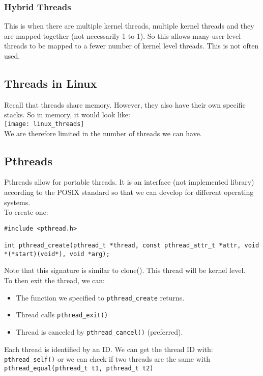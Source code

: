 \documentclass[12pt]{article}
\theoremstyle{definition}
\begin{document}
\subsubsection{Hybrid Threads}
This is when there are multiple kernel threads, multiple kernel threads and they are mapped together (not necessarily 1 to 1). So this allows many user level threads to be mapped to a fewer number of kernel level threads. This is not often used.

\subsection{Threads in Linux}
Recall that threads share memory. However, they also have their own specific stacks. So in memory, it would look like:
\\
\texttt{[image: linux\_threads]}
\\
We are therefore limited in the number of threads we can have.
\subsection{Pthreads}
Pthreads allow for portable threads. It is an interface (not implemented library) according to the POSIX standard so that we can develop for different operating systems.
\\ \linebreak
To create one:
\begin{lstlisting}
#include <pthread.h>

int pthread_create(pthread_t *thread, const pthread_attr_t *attr, void *(*start)(void*), void *arg);

\end{lstlisting}
Note that this signature is similar to clone(). This thread will be kernel level.
\\ \linebreak
To then exit the thread, we can:
\begin{itemize}
	\item The function we specified to \texttt{pthread\_create} returns. 
	\item Thread calls \texttt{pthread\_exit()}
	\item Thread is canceled by \texttt{pthread\_cancel()} (preferred).
\end{itemize}
Each thread is identified by an ID. We can get the thread ID with: \texttt{pthread\_self()} or we can check if two threads are the same with \texttt{pthread\_equal(pthread\_t t1, pthread\_t t2)}
\\ \linebreak
\end{document}
